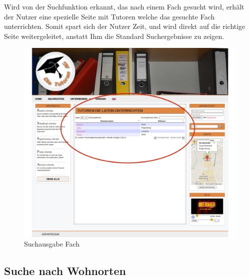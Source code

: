 Wird von der Suchfunktion erkannt, das nach einem Fach gesucht wird, erhält der 
Nutzer eine spezielle Seite mit Tutoren welche das gesuchte Fach unterrichten. 
Somit spart sich der Nutzer Zeit, und wird direkt auf die richtige Seite 
weitergeleitet, anstatt Ihm die Standard Suchergebnisse zu zeigen.
\begin{figure}[!htbp]
\centering
\includegraphics[width=1\linewidth]{../Screenshots/de/Suche_Fach}
\caption{Suchausgabe Fach}
\label{fig:SuchausgabeFach}
\end{figure}


\newpage

\subsection{Suche nach Wohnorten}

